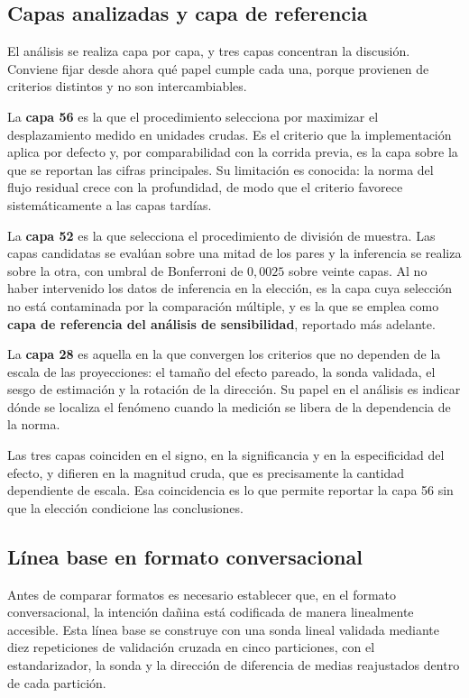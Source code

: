 \documentclass[12pt,a4paper]{article}
\begin{document}
\subsection{Capas analizadas y capa de referencia}

\justifying

El análisis se realiza capa por capa, y tres capas concentran la discusión. Conviene fijar desde ahora qué papel cumple cada una, porque provienen de criterios distintos y no son intercambiables.

La \textbf{capa 56} es la que el procedimiento selecciona por maximizar el desplazamiento medido en unidades crudas. Es el criterio que la implementación aplica por defecto y, por comparabilidad con la corrida previa, es la capa sobre la que se reportan las cifras principales. Su limitación es conocida: la norma del flujo residual crece con la profundidad, de modo que el criterio favorece sistemáticamente a las capas tardías.

La \textbf{capa 52} es la que selecciona el procedimiento de división de muestra. Las capas candidatas se evalúan sobre una mitad de los pares y la inferencia se realiza sobre la otra, con umbral de Bonferroni de $0{,}0025$ sobre veinte capas. Al no haber intervenido los datos de inferencia en la elección, es la capa cuya selección no está contaminada por la comparación múltiple, y es la que se emplea como \textbf{capa de referencia del análisis de sensibilidad}, reportado más adelante.

La \textbf{capa 28} es aquella en la que convergen los criterios que no dependen de la escala de las proyecciones: el tamaño del efecto pareado, la sonda validada, el sesgo de estimación y la rotación de la dirección. Su papel en el análisis es indicar dónde se localiza el fenómeno cuando la medición se libera de la dependencia de la norma.

Las tres capas coinciden en el signo, en la significancia y en la especificidad del efecto, y difieren en la magnitud cruda, que es precisamente la cantidad dependiente de escala. Esa coincidencia es lo que permite reportar la capa 56 sin que la elección condicione las conclusiones.

\subsection{Línea base en formato conversacional}

\justifying

Antes de comparar formatos es necesario establecer que, en el formato conversacional, la intención dañina está codificada de manera linealmente accesible. Esta línea base se construye con una sonda lineal validada mediante diez repeticiones de validación cruzada en cinco particiones, con el estandarizador, la sonda y la dirección de diferencia de medias reajustados dentro de cada partición.
\end{document}
